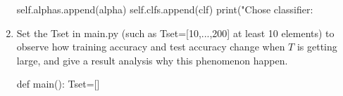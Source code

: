 \documentclass[12pt,letterpaper]{article}
\theoremstyle{definition}
\begin{document}
\begin{enumerate}[label=(\alph*)]
\begin{python}
            self.alphas.append(alpha)
            self.clfs.append(clf)
            print("Chose classifier: %
    \end{python}
    \item Set the Tset in main.py (such as Tset=[10,...,200] at least 10 elements) to observe how training accuracy and test accuracy change when $T$ is getting large, and give a result analysis why this phenomenon happen.
    \begin{python}
         def main():
             Tset=[]
    \end{python}

    \end{enumerate}
\end{document}
